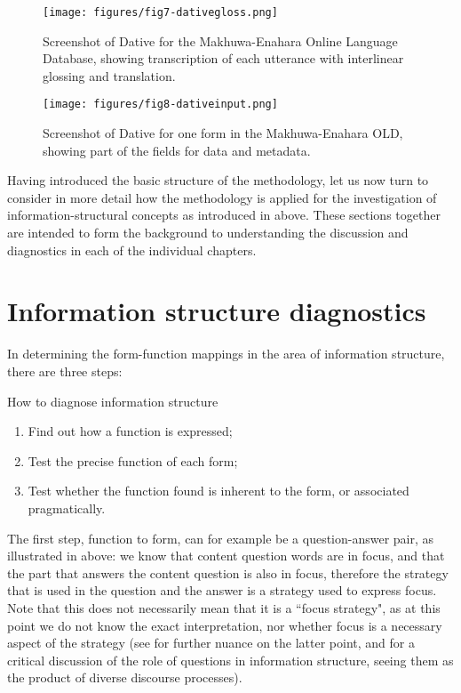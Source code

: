 \documentclass[output=paper]{langscibook}
\begin{document}
  
\begin{figure}
\texttt{[image: figures/fig7-dativegloss.png]}
\caption{Screenshot of Dative for the Makhuwa-Enahara Online Language Database, showing transcription of each utterance with interlinear glossing and translation.}
\label{fig:dativegloss}
\end{figure}

\begin{figure}
\texttt{[image: figures/fig8-dativeinput.png]}
\caption{Screenshot of Dative for one form in the Makhuwa-Enahara OLD, showing part of the fields for data and metadata.}
\label{fig:dativeinput}
\end{figure}

Having introduced the basic structure of the methodology, let us now turn to consider in more detail how the methodology is applied for the investigation of information-structural concepts as introduced in  above. These sections together are intended to form the background to understanding the discussion and diagnostics in each of the individual chapters.

\section{Information structure diagnostics}
\label{bkm:Ref117846329}\label{sec:6}
\largerpage[2]

In determining the form-function mappings in the area of information structure, there are three steps: 

\ea
How to diagnose information structure
\begin{enumerate}
    \item Find out how a function is expressed;
    \item  Test the precise function of each form;
    \item  Test whether the function found is inherent to the form, or associated pragmatically.
\end{enumerate}
\z

The first step, function to form, can for example be a question-answer pair, as illustrated in  above: we know that content question words are in focus, and that the part that answers the content question is also in focus, therefore the strategy that is used in the question and the answer is a strategy used to express focus. Note that this does not necessarily mean that it is a ``focus strategy", as at this point we do not know the exact interpretation, nor whether focus is a necessary aspect of the strategy (see \citealt{MatićWedgwood2013} for further nuance on the latter point, and \citealt{Ozerov2022} for a critical discussion of the role of questions in information structure, seeing them as the product of diverse discourse processes).
\end{document}

